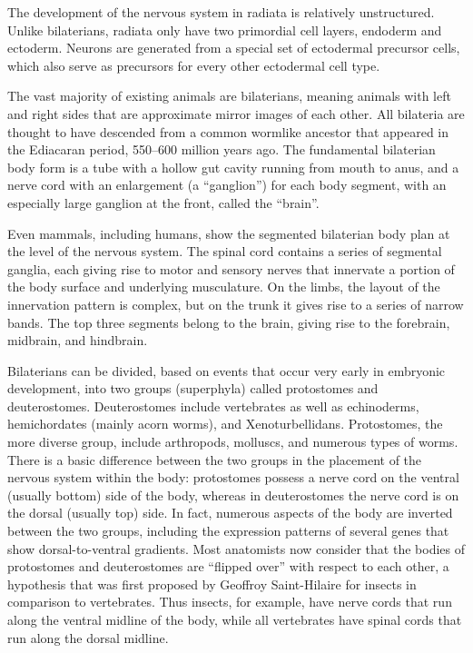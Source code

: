 The development of the nervous system in radiata is relatively unstructured. Unlike bilaterians, radiata only have two primordial cell layers, endoderm and ectoderm. Neurons are generated from a special set of ectodermal precursor cells, which also serve as precursors for every other ectodermal cell type.

The vast majority of existing animals are bilaterians, meaning animals with left and right sides that are approximate mirror images of each other. All bilateria are thought to have descended from a common wormlike ancestor that appeared in the Ediacaran period, 550--600 million years ago. The fundamental bilaterian body form is a tube with a hollow gut cavity running from mouth to anus, and a nerve cord with an enlargement (a ``ganglion'') for each body segment, with an especially large ganglion at the front, called the ``brain''.

Even mammals, including humans, show the segmented bilaterian body plan at the level of the nervous system. The spinal cord contains a series of segmental ganglia, each giving rise to motor and sensory nerves that innervate a portion of the body surface and underlying musculature. On the limbs, the layout of the innervation pattern is complex, but on the trunk it gives rise to a series of narrow bands. The top three segments belong to the brain, giving rise to the forebrain, midbrain, and hindbrain.

Bilaterians can be divided, based on events that occur very early in embryonic development, into two groups (superphyla) called protostomes and deuterostomes. Deuterostomes include vertebrates as well as echinoderms, hemichordates (mainly acorn worms), and Xenoturbellidans. Protostomes, the more diverse group, include arthropods, molluscs, and numerous types of worms. There is a basic difference between the two groups in the placement of the nervous system within the body: protostomes possess a nerve cord on the ventral (usually bottom) side of the body, whereas in deuterostomes the nerve cord is on the dorsal (usually top) side. In fact, numerous aspects of the body are inverted between the two groups, including the expression patterns of several genes that show dorsal-to-ventral gradients. Most anatomists now consider that the bodies of protostomes and deuterostomes are ``flipped over'' with respect to each other, a hypothesis that was first proposed by Geoffroy Saint-Hilaire for insects in comparison to vertebrates. Thus insects, for example, have nerve cords that run along the ventral midline of the body, while all vertebrates have spinal cords that run along the dorsal midline.

